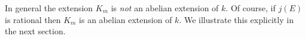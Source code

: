 \begin{rem}
  \label{rem:not-abelian-over-k}
  In general the extension $K_{m}$ is \emph{not} an abelian extension of $k$.  Of
  course, if $j(E)$ is rational then $K_{m}$ is an abelian extension of $k$.  We
  illustrate this explicitly in the next section.
\end{rem}

